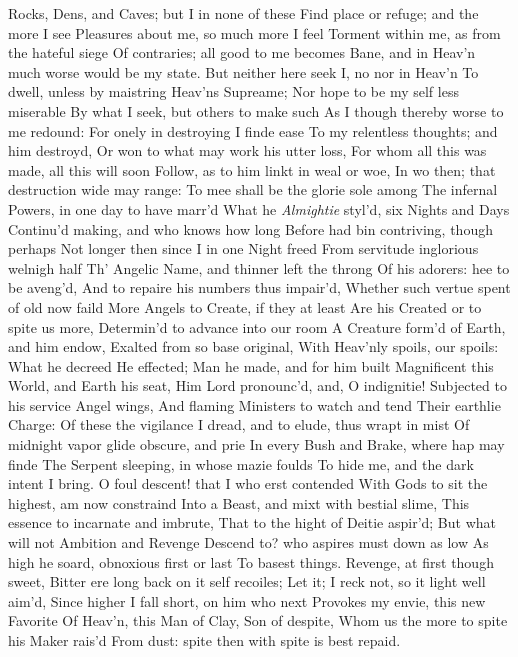 \documentclass[11pt]{book}
\newcounter {first}
\newcounter {last}
\begin{document}
Rocks, Dens, and Caves; but I in none of these 
Find place or refuge; and the more I see 
Pleasures about me, so much more I feel 
Torment within me, as from the hateful siege 
Of contraries; all good to me becomes 
Bane, and in Heav'n much worse would be my state. 
But neither here seek I, no nor in Heav'n 
To dwell, unless by maistring Heav'ns Supreame; 
Nor hope to be my self less miserable 
By what I seek, but others to make such 
As I though thereby worse to me redound: 
For onely in destroying I finde ease 
To my relentless thoughts; and him destroyd, 
Or won to what may work his utter loss, 
For whom all this was made, all this will soon 
Follow, as to him linkt in weal or woe, 
In wo then; that destruction wide may range: 
To mee shall be the glorie sole among 
The infernal Powers, in one day to have marr'd 
What he \textit{Almightie} styl'd, six Nights and Days 
Continu'd making, and who knows how long 
Before had bin contriving, though perhaps 
Not longer then since I in one Night freed 
From servitude inglorious welnigh half 
Th' Angelic Name, and thinner left the throng 
Of his adorers: hee to be aveng'd, 
And to repaire his numbers thus impair'd, 
Whether such vertue spent of old now faild 
More Angels to Create, if they at least 
Are his Created or to spite us more, 
Determin'd to advance into our room 
A Creature form'd of Earth, and him endow, 
Exalted from so base original, 
With Heav'nly spoils, our spoils: What he decreed 
He effected; Man he made, and for him built 
Magnificent this World, and Earth his seat, 
Him Lord pronounc'd, and, O indignitie! 
Subjected to his service Angel wings, 
And flaming Ministers to watch and tend 
Their earthlie Charge: Of these the vigilance 
I dread, and to elude, thus wrapt in mist 
Of midnight vapor glide obscure, and prie 
In every Bush and Brake, where hap may finde 
The Serpent sleeping, in whose mazie foulds 
To hide me, and the dark intent I bring. 
O foul descent! that I who erst contended 
With Gods to sit the highest, am now constraind 
Into a Beast, and mixt with bestial slime, 
This essence to incarnate and imbrute, 
That to the hight of Deitie aspir'd; 
But what will not Ambition and Revenge 
Descend to? who aspires must down as low 
As high he soard, obnoxious first or last 
To basest things.  Revenge, at first though sweet, 
Bitter ere long back on it self recoiles; 
Let it; I reck not, so it light well aim'd, 
Since higher I fall short, on him who next 
Provokes my envie, this new Favorite 
Of Heav'n, this Man of Clay, Son of despite, 
Whom us the more to spite his Maker rais'd 
From dust: spite then with spite is best repaid. 
\end{document}

